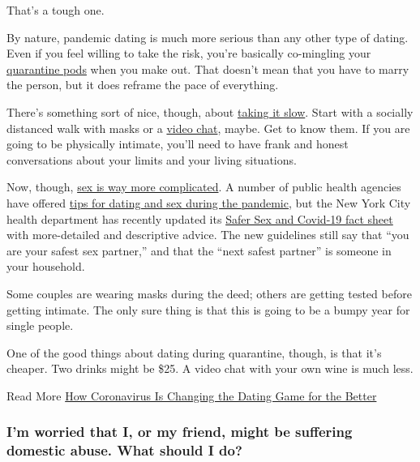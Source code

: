 That's a tough one.

By nature, pandemic dating is much more serious than any other type of
dating. Even if you feel willing to take the risk, you're basically
co-mingling your
\href{https://www.nytimes3xbfgragh.onion/2020/06/09/parenting/coronavirus-pod-family.html}{quarantine
pods} when you make out. That doesn't mean that you have to marry the
person, but it does reframe the pace of everything.

There's something sort of nice, though, about
\href{https://www.nytimes3xbfgragh.onion/2020/05/21/style/first-date-during-quarantine-coronavirus.html}{taking
it slow}. Start with a socially distanced walk with masks or a
\href{https://www.nytimes3xbfgragh.onion/2020/04/18/nyregion/coronavirus-dating-video.html}{video
chat}, maybe. Get to know them. If you are going to be physically
intimate, you'll need to have frank and honest conversations about your
limits and your living situations.

Now, though,
\href{https://www.nytimes3xbfgragh.onion/2020/06/11/well/live/coronavirus-sex-dating-masks.html}{sex
is way more complicated}. A number of public health agencies have
offered
\href{https://www.nytimes3xbfgragh.onion/2020/05/20/world/netherlands-sex-buddies-coronavirus.html}{tips
for dating and sex during the pandemic}, but the New York City health
department has recently updated its
\href{https://www1.nyc.gov/assets/doh/downloads/pdf/imm/covid-sex-guidance.pdf}{Safer
Sex and Covid-19 fact sheet} with more-detailed and descriptive advice.
The new guidelines still say that ``you are your safest sex partner,''
and that the ``next safest partner'' is someone in your household.

Some couples are wearing masks during the deed; others are getting
tested before getting intimate. The only sure thing is that this is
going to be a bumpy year for single people.

One of the good things about dating during quarantine, though, is that
it's cheaper. Two drinks might be \$25. A video chat with your own wine
is much less.

Read More
\href{https://www.nytimes3xbfgragh.onion/2020/05/07/well/mind/dating-coronavirus-love-relationships.html}{How
Coronavirus Is Changing the Dating Game for the Better}

\hypertarget{im-worried-that-i-or-my-friend-might-be-suffering-domestic-abuse-what-should-i-do}{%
\subsubsection{I'm worried that I, or my friend, might be suffering
domestic abuse. What should I
do?}\label{im-worried-that-i-or-my-friend-might-be-suffering-domestic-abuse-what-should-i-do}}

